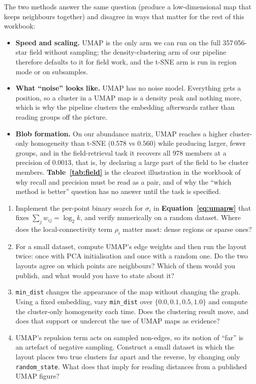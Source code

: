 The two methods answer the same question (produce a low-dimensional map that
keeps neighbours together) and disagree in ways that matter for the rest of
this workbook:

\begin{itemize}
\item \textbf{Speed and scaling.} UMAP is the only arm we can run on the full
  357\,056-star field without sampling; the density-clustering arm of our
  pipeline therefore defaults to it for field work, and the t-SNE arm is run in
  region mode or on subsamples.
\item \textbf{What ``noise'' looks like.} UMAP has no noise model. Everything
gets a position, so a cluster in a UMAP map is a density peak and nothing more,
which is why the pipeline clusters the embedding afterwards rather than reading
groups off the picture.
\item \textbf{Blob formation.} On our abundance matrix, UMAP reaches a higher
cluster-only homogeneity than t-SNE ($0.578$ vs $0.560$) while producing
larger, fewer groups, and in the field-retrieval task it recovers all 978
members at a precision of $0.0013$, that is, by declaring a large part of the
field to be cluster members. \textbf{Table~\ref{tab:field}} is the clearest
illustration in the workbook of why recall and precision must be read as a
pair, and of why the ``which method is better'' question has no answer until
the task is specified.
\end{itemize}

\begin{issues}[EXERCISES]
\begin{enumerate}
\item Implement the per-point binary search for $\sigma_i$ in
  \textbf{Equation~\ref{eq:umapw}} that fixes $\sum_j w_{ij} = \log_2 k$, and
  verify numerically on a random dataset. Where does the local-connectivity
  term $\rho_i$ matter most: dense regions or sparse ones?
\item For a small dataset, compute UMAP's edge weights and then run the
  layout twice: once with PCA initialisation and once with a random one. Do
  the two layouts agree on which points are neighbours? Which of them would
  you publish, and what would you have to state about it?
\item \texttt{min\_dist} changes the appearance of the map without changing
  the graph. Using a fixed embedding, vary \texttt{min\_dist} over
  $\{0.0, 0.1, 0.5, 1.0\}$ and compute the cluster-only homogeneity each time.
  Does the clustering result move, and does that support or undercut the use
  of UMAP maps as evidence?
\item UMAP's repulsion term acts on sampled non-edges, so its notion of
  ``far'' is an artefact of negative sampling. Construct a small dataset in
  which the layout places two true clusters far apart and the reverse, by
  changing only \texttt{random\_state}. What does that imply for reading
  distances from a published UMAP figure?
\end{enumerate}
\end{issues}
